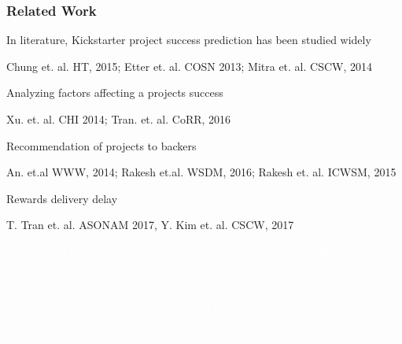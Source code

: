 \documentclass[9pt]{beamer}
\newcommand{\SubItemBlue}[1]{
	{\setlength\itemindent{15pt} \item[\color{blue}\textbullet] #1}
}
\begin{document}
\begin{frame}
	\frametitle{Related Work}
	\begin{itemize}[label=\textcolor{blue}{\textbullet}]
		\item{In literature, Kickstarter project success prediction has been studied widely}
		\SubItemBlue{\small Chung et. al. HT, 2015; Etter et. al. COSN 2013; Mitra et. al. CSCW, 2014}
		\item{ {Analyzing factors affecting a projects success}}
		\SubItemBlue{\small {Xu. et. al. CHI 2014; Tran. et. al. CoRR, 2016}}
		\item{ {Recommendation of projects to backers }}
		\SubItemBlue{\small {An. et.al WWW, 2014; Rakesh et.al. WSDM, 2016; Rakesh et. al. ICWSM, 2015}}
		\item{Rewards delivery delay}
		\SubItemBlue{\small T. Tran et. al. ASONAM 2017, Y. Kim et. al. CSCW, 2017}
		
 		\item[\textcolor{white}{\textbullet}]{\textcolor{white} {Previous studies are limited to understanding projects during funding phase}}
		\vspace{10pt}
		\item[\textcolor{white}{\textbullet}]{\textcolor{white} {No study about \textit{Production Phase}}}
		
	\end{itemize}
	
	\vspace{10pt}
	\centering
	\textcolor{white} {Our work analyzes quality of crowdfunded products in market.}
	
	\vspace{10pt}
	\centering
	\textcolor{white}{Why is it important ?}
	
\end{frame}
\end{document}
